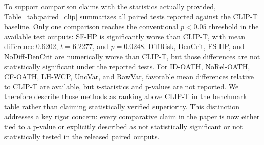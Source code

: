 \documentclass{article}
\begin{document}
To support comparison claims with the statistics actually provided, Table~\ref{tab:paired_clip} summarizes all paired tests reported against the CLIP-T baseline. Only one comparison reaches the conventional \(p<0.05\) threshold in the available test outputs: SF-HP is significantly worse than CLIP-T, with mean difference \(0.6202\), \(t=6.2277\), and \(p=0.0248\). DiffRisk, DenCrit, FS-HP, and NoDiff-DenCrit are numerically worse than CLIP-T, but those differences are not statistically significant under the reported tests. For ID-OATH, NoRel-OATH, CF-OATH, LH-WCP, UncVar, and RawVar, favorable mean differences relative to CLIP-T are available, but \(t\)-statistics and p-values are not reported. We therefore describe those methods as ranking above CLIP-T in the benchmark table rather than claiming statistically verified superiority. This distinction addresses a key rigor concern: every comparative claim in the paper is now either tied to a p-value or explicitly described as not statistically significant or not statistically tested in the released paired outputs.
\end{document}
